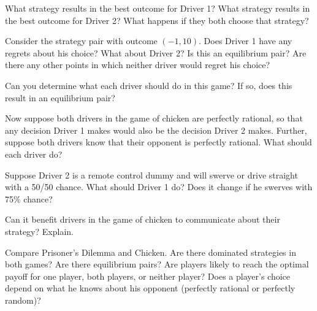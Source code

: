 \begin{xca}\label{E:Cbestoutcome}
What strategy results in the best outcome for Driver 1? What strategy results in the best outcome for Driver 2? What happens if they both choose that strategy?
\end{xca}

\begin{xca}\label{E:Cequilpairs}
Consider the strategy pair with outcome $(-1, 10)$. Does Driver 1 have any regrets about his choice? What about Driver 2? Is this an equilibrium pair? Are there any other points in which neither driver would regret his choice?
\end{xca}

\begin{xca}\label{E:Cbeststrat}
Can you determine what each driver should do in this game? If so, does this result in an equilibrium pair?
\end{xca}

\begin{xca}\label{E:Csamestrat}
Now suppose both drivers in the game of chicken are perfectly rational, so that any decision Driver 1 makes would also be the decision Driver 2 makes. Further, suppose both drivers know that their opponent is perfectly rational. What should each driver do?
\end{xca}

\begin{xca}\label{E:Crandom} Suppose Driver 2 is a remote control dummy and will swerve or drive straight with a 50/50 chance. What should Driver 1 do? Does it change if he swerves with 75\% chance?
\end{xca}

\begin{xca}\label{E:Ccommunicate}
Can it benefit drivers in the game of chicken to communicate about their strategy? Explain.
\end{xca}

\begin{xca}\label{E:comparePDC} 
Compare Prisoner's Dilemma and Chicken. Are there dominated strategies in both games? Are there equilibrium pairs? Are players likely to reach the optimal payoff for one player, both players, or neither player? Does a player's choice depend on what he knows about his opponent (perfectly rational or perfectly random)?
\end{xca}





 